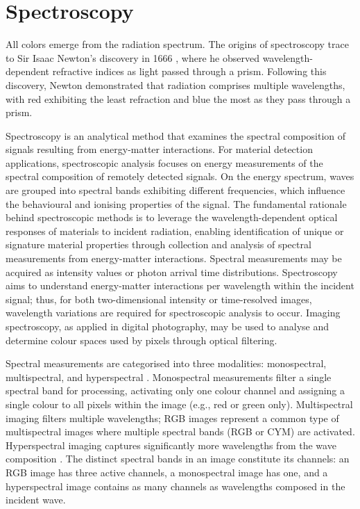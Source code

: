 \documentclass[12pt,a4paper,oneside]{report}
\let\oldsection\section
\renewcommand{\section}{\clearpage\oldsection}
\begin{document}
\newpage
\section{Spectroscopy}
\label{sec:spectroscopy}

All colors emerge from the radiation spectrum. The origins of spectroscopy trace to Sir Isaac Newton's discovery in 1666 \cite{su2016,holt2016}, where he observed wavelength-dependent refractive indices as light passed through a prism. Following this discovery, Newton demonstrated that radiation comprises multiple wavelengths, with red exhibiting the least refraction and blue the most as they pass through a prism.

Spectroscopy is an analytical method that examines the spectral composition of signals resulting from energy-matter interactions. For material detection applications, spectroscopic analysis focuses on energy measurements of the spectral composition of remotely detected signals. On the energy spectrum, waves are grouped into spectral bands exhibiting different frequencies, which influence the behavioural and ionising properties of the signal. The fundamental rationale behind spectroscopic methods is to leverage the wavelength-dependent optical responses of materials to incident radiation, enabling identification of unique or signature material properties through collection and analysis of spectral measurements from energy-matter interactions. Spectral measurements may be acquired as intensity values or photon arrival time distributions. Spectroscopy aims to understand energy-matter interactions per wavelength within the incident signal; thus, for both two-dimensional intensity or time-resolved images, wavelength variations are required for spectroscopic analysis to occur. Imaging spectroscopy, as applied in digital photography, may be used to analyse and determine colour spaces used by pixels through optical filtering.

Spectral measurements are categorised into three modalities: monospectral, multispectral, and hyperspectral \cite{heinz2001,vasile2023}. Monospectral measurements filter a single spectral band for processing, activating only one colour channel and assigning a single colour to all pixels within the image (e.g., red or green only). Multispectral imaging filters multiple wavelengths; RGB images represent a common type of multispectral images where multiple spectral bands (RGB or CYM) are activated. Hyperspectral imaging captures significantly more wavelengths from the wave composition \cite{heinz2001,vasile2023}. The distinct spectral bands in an image constitute its channels: an RGB image has three active channels, a monospectral image has one, and a hyperspectral image contains as many channels as wavelengths composed in the incident wave.
\end{document}
